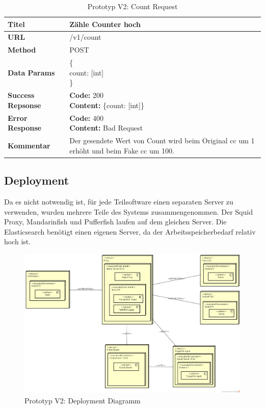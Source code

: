 \begin{table}[H]
    \centering
	\begin{tabularx}{\textwidth}{| l | X |}
        \hline
        \textbf{Titel} & Zähle Counter hoch \\\hline        
        \textbf{URL} & /v1/count \\ \hline
        \textbf{Method} & POST\\ \hline
        \textbf{Data Params} & \pbox{30cm}{\vspace{3mm} \{\\count: [int] \\ \} \vspace{3mm}}\\ \hline
        \textbf{Success Repsonse} & \pbox{30cm}{\vspace{3mm} \textbf{Code:} 200 \\ \textbf{Content:} \{count: [int]\} \vspace{3mm}}\\ \hline
        \textbf{Error Response} & \pbox{30cm}{\vspace{3mm} \textbf{Code:} 400 \\ \textbf{Content:} Bad Request \vspace{3mm}}\\ \hline
        \textbf{Kommentar} & Der gesendete Wert von Count wird beim Original \gls{cc} um 1 erhöht und beim Fake \gls{cc} um 100.\\ \hline
    \end{tabularx}
    \caption{Prototyp V2: Count Request}
\end{table}

\newpage
\subsection{Deployment}
Da es nicht notwendig ist, für jede Teilsoftware einen separaten Server zu verwenden, wurden mehrere Teile des Systems zusammengenommen. Der Squid Proxy, Mandarinfish und Pufferfish laufen auf dem gleichen Server. Die Elasticsearch benötigt einen eigenen Server, da der Arbeitsspeicherbedarf relativ hoch ist.


\begin{figure}[H]
	\centering
	\includegraphics[width=\textwidth]{img/PrototypV2.png}
	\caption{Prototyp V2: Deployment Diagramm}
	\label{fig:Prototyp_V2}
\end{figure}



